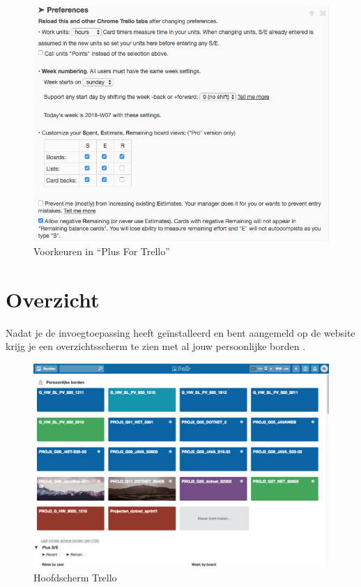 \begin{figure}[h]
	\centering
	\includegraphics[width=\textwidth]{./afbeeldingen/prefsplusfortrello.png}
	\caption{Voorkeuren in ``Plus For Trello''}
	\label{fig:prefsplusfortrello}
\end{figure} 

\section{Overzicht}

Nadat je de invoegtoepassing heeft ge\"installeerd en bent aangemeld op de website krijg je een overzichtsscherm te zien met al jouw persoonlijke borden .

\begin{figure}[!h]
	\centering
	\includegraphics[width=\textwidth]{./afbeeldingen/overzicht.png}
	\caption{Hoofdscherm Trello}
	\label{fig:overzicht}	
\end{figure} 

